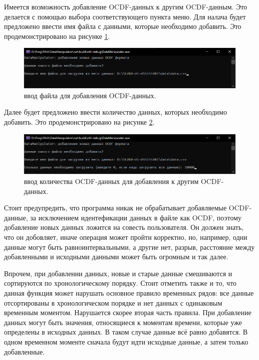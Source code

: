 {\standartFont

  \par Имеется возможность добавление OCDF-данных к другим OCDF-данным. Это делается с помощью выбора соответствующего пункта меню. Для налача будет предложено ввести имя файла с данными, которые необходимо добавить. Это продемонстрировано на рисунке \ref{fig:AddOCDF}.

  \begin{figure}[H]
    \centering
    \includegraphics[width=\textwidth]{images/forDataManipulator/AddOCDF.png}
    \caption{ввод файла для добавления OCDF-данных.} 
    \label{fig:AddOCDF}
  \end{figure}

  \par Далее будет предложено ввести количество данных, которых необходимо добавить. Это продемонстрировано на рисунке \ref{fig:AddOCDFHowMany}.
  
  \begin{figure}[H]
    \centering
    \includegraphics[width=\textwidth]{images/forDataManipulator/AddOCDFHowMany.png}
    \caption{ввод количества OCDF-данных для добавления к другим OCDF-данных.} 
    \label{fig:AddOCDFHowMany}
  \end{figure}

  \par Стоит предупредить, что программа никак не обрабатывает добавляемые OCDF-данные, за исключением идентефикации данных в файле как OCDF, поэтому добавление новых данных ложится на совесть пользователя. Он должен знать, что он добовляет, иначе операция может пройти корректно, но, например, одни данные могут быть равноинтервальными, а другие нет, разрыв, расстояние между добавленными и исходными данными может быть огромным и так далее. 

  \par Впрочем, при добавлении данных, новые и старые данные смешиваются и сортируются по хронологическому порядку. Стоит отметить также и то, что данная функция может нарушать основное правило временных рядов: все данные отсортированы в хронологическом порядке и нет данных с одинаковым временным моментом. Нарушается скорее вторая часть правила. При добавление данных могут быть значения, относящиеся к моментам времени, которые уже определены в исходных данных. В таком случае данные всё равно добавятся. В одном временном моменте сначала будут идти исходные данные, а затем только добавленные. 

}
